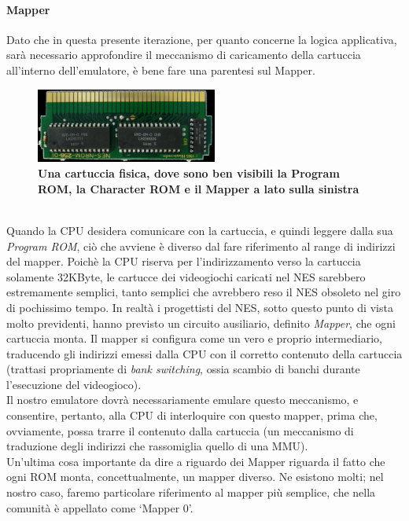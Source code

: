 \documentclass[11pt]{article}
\begin{document}
\paragraph{Mapper} Dato che in questa presente iterazione, per quanto concerne la logica applicativa, sarà necessario approfondire il meccanismo di caricamento della cartuccia all'interno dell'emulatore, è bene fare una parentesi sul Mapper.
\begin{figure}[h]
\centering
\includegraphics[width=225px, height = 93px]{ROM.jpg}\\
\small\textbf{Una cartuccia fisica, dove sono ben visibili la Program ROM, la Character ROM e il Mapper a lato sulla sinistra}
\end{figure}\\
Quando la CPU desidera comunicare con la cartuccia, e quindi leggere dalla sua \emph{Program ROM}, ciò che avviene è diverso dal fare riferimento al range di indirizzi del mapper. Poichè la CPU riserva per l'indirizzamento verso la cartuccia solamente 32KByte, le cartucce dei videogiochi caricati nel NES sarebbero estremamente semplici, tanto semplici che avrebbero reso il NES obsoleto nel giro di pochissimo tempo. In realtà i progettisti del NES, sotto questo punto di vista molto previdenti, hanno previsto un circuito ausiliario, definito \emph{Mapper}, che ogni cartuccia monta. Il mapper si configura come un vero e proprio intermediario, traducendo gli indirizzi emessi dalla CPU con il corretto contenuto della cartuccia (trattasi propriamente di \emph{bank switching}, ossia scambio di banchi durante l'esecuzione del videogioco).\\
Il nostro emulatore dovrà necessariamente emulare questo meccanismo, e consentire, pertanto, alla CPU di interloquire con questo mapper, prima che, ovviamente, possa trarre il contenuto dalla cartuccia (un meccanismo di traduzione degli indirizzi che rassomiglia quello di una MMU).\\
Un'ultima cosa importante da dire a riguardo dei Mapper riguarda il fatto che ogni ROM monta, concettualmente, un mapper diverso. Ne esistono molti; nel nostro caso, faremo particolare riferimento al mapper più semplice, che nella comunità è appellato come `Mapper 0'.
\end{document}
